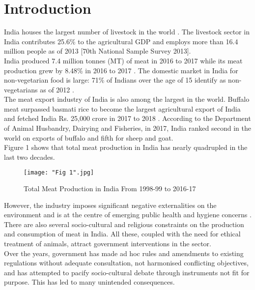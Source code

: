 \documentclass[a4paper, 12pt]{article}
\begin{document}
\newpage
\section{Introduction}
India houses the largest number of livestock in the world \parencite{sharmanews}. The livestock sector in India contributes 25.6\% to the agricultural GDP and employs more than 16.4 million people as of 2013 [70th National Sample Survey 2013].\\

India produced 7.4 million tonnes (MT) of meat in 2016 to 2017 \parencite{dahreport} while its meat production grew by 8.48\% in 2016 to 2017 \parencite{dah1report}. The domestic market in India for non-vegetarian food is large: 71\% of Indians over the age of 15 identify as non-vegetarians as of 2012 \parencite{mspireport}. \\

The meat export industry of India is also among the largest in the world. Buffalo meat surpassed basmati rice to become the largest agricultural export of India and fetched India Rs. 25,000 crore in 2017 to 2018 \parencite{apedastats}. According to the Department of Animal Husbandry, Dairying and Fisheries, in 2017, India ranked second in the world on exports of buffalo and fifth for sheep and goat.\\ 

Figure 1 shows that total meat production in India has nearly quadrupled in the last two decades.\\

\begin{figure}[H]
\centering
\texttt{[image: "Fig 1".jpg]}
\caption{Total Meat Production in India From 1998-99 to 2016-17 \parencite{cmiestats}}
\end{figure}

However, the industry imposes significant negative externalities on the environment and is at the centre of emerging public health and hygiene concerns \parencite{praderepaper}. There are also several socio-cultural and religious constraints on the production and consumption of meat in India. All these, coupled with the need for ethical treatment of animals, attract government interventions in the sector. \\

Over the years, government has made ad hoc rules and amendments to existing regulations without adequate consultation, not harmonised conflicting objectives, and has attempted to pacify socio-cultural debate through instruments not fit for purpose. This has led to many unintended consequences.\\
\end{document}
